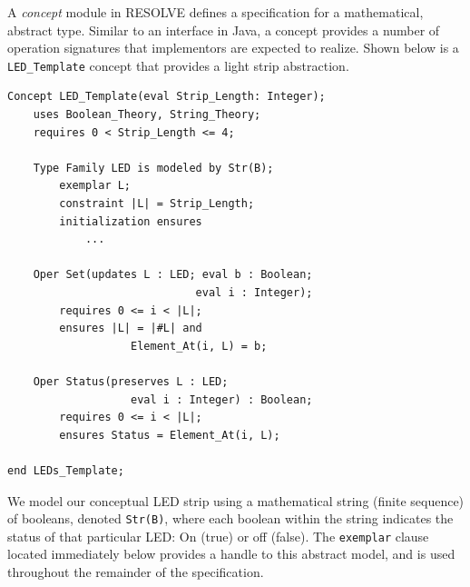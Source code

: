 \documentclass{sig-alternate}
\begin{document}
A \textit{concept} module in RESOLVE defines a specification for a mathematical, abstract type. Similar to an interface in Java, a concept provides a number of operation signatures that implementors are expected to realize. Shown below is a \texttt{LED\_Template} concept that provides a light strip abstraction.

\begin{verbatim}
Concept LED_Template(eval Strip_Length: Integer);
    uses Boolean_Theory, String_Theory;
    requires 0 < Strip_Length <= 4;
	
    Type Family LED is modeled by Str(B);
        exemplar L;
        constraint |L| = Strip_Length;
        initialization ensures 
            ...
    
    Oper Set(updates L : LED; eval b : Boolean; 
                             eval i : Integer);
        requires 0 <= i < |L|;
        ensures |L| = |#L| and 
                   Element_At(i, L) = b;
    
    Oper Status(preserves L : LED; 
                   eval i : Integer) : Boolean;
        requires 0 <= i < |L|;
        ensures Status = Element_At(i, L);
        
end LEDs_Template;
\end{verbatim}

We model our conceptual LED strip using a mathematical string (finite sequence) of booleans, denoted \texttt{Str(B)}, where each boolean within the string indicates the status of that particular LED: On (true) or off (false). The \texttt{exemplar} clause located immediately below provides a handle to this abstract model, and is used throughout the remainder of the specification.

\end{document}
